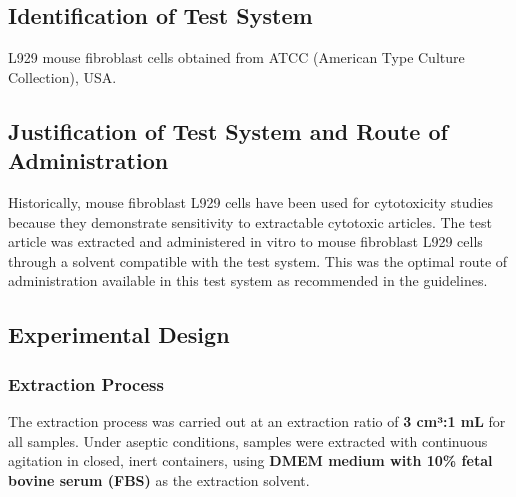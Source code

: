 \documentclass[
  12pt,
]{article}
\begin{document}
\subsection{Identification of Test
System}\label{identification-of-test-system}

L929 mouse fibroblast cells obtained from ATCC (American Type Culture
Collection), USA.

\subsection{Justification of Test System and Route of
Administration}\label{justification-of-test-system-and-route-of-administration}

Historically, mouse fibroblast L929 cells have been used for
cytotoxicity studies because they demonstrate sensitivity to extractable
cytotoxic articles. The test article was extracted and administered in
vitro to mouse fibroblast L929 cells through a solvent compatible with
the test system. This was the optimal route of administration available
in this test system as recommended in the guidelines.

\newpage

\subsection{Experimental Design}\label{experimental-design}

\subsubsection{Extraction Process}\label{extraction-process}

The extraction process was carried out at an extraction ratio of
\textbf{3 cm³:1 mL} for all samples. Under aseptic conditions, samples
were extracted with continuous agitation in closed, inert containers,
using \textbf{DMEM medium with 10\% fetal bovine serum (FBS)} as the
extraction solvent.
\end{document}
